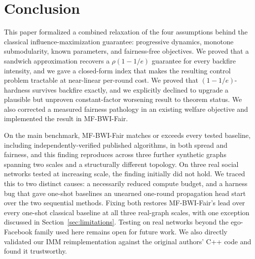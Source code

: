 \documentclass[journal]{IEEEtran}
\begin{document}
\section{Conclusion}

This paper formalized a combined relaxation of the four assumptions
behind the classical influence-maximization guarantee: progressive
dynamics, monotone submodularity, known parameters, and fairness-free
objectives. We proved that a sandwich approximation recovers a
$\rho(1-1/e)$ guarantee for every backfire intensity, and we gave a
closed-form index that makes the resulting control problem tractable at
near-linear per-round cost. We proved that $(1-1/e)$-hardness survives
backfire exactly, and we explicitly declined to upgrade a plausible but
unproven constant-factor worsening result to theorem status. We also
corrected a measured fairness pathology in an existing welfare objective
and implemented the result in MF-BWI-Fair.

On the main benchmark, MF-BWI-Fair matches or exceeds every tested
baseline, including independently-verified published algorithms, in both
spread and fairness, and this finding reproduces across three further
synthetic graphs spanning two scales and a structurally different
topology. On three real social networks tested at increasing scale, the
finding initially did not hold. We traced this to two distinct causes: a
necessarily reduced compute budget, and a harness bug that gave one-shot
baselines an unearned one-round propagation head start over the two
sequential methods. Fixing both restores MF-BWI-Fair's lead over every
one-shot classical baseline at all three real-graph scales, with one
exception discussed in Section~\ref{sec:limitations}. Testing on real
networks beyond the ego-Facebook family used here remains open for
future work. We also directly validated our IMM reimplementation
against the original authors' C++ code and found it trustworthy.



\end{document}
